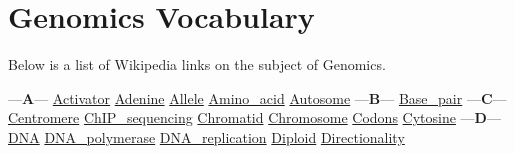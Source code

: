 \chapter{Genomics Vocabulary}
\label{ch-genomics-glossary}

\setlength{\columnsep}{3cm}

Below is a list of Wikipedia links on the subject of Genomics.


\begin{multicols}{3}
\noindent
---{\bf A}---\newline
\href{https://en.wikipedia.org/wiki/Activator_(genetics)}{Activator}\newline
\href{https://en.wikipedia.org/wiki/Adenine}{Adenine}\newline
\href{https://en.wikipedia.org/wiki/Allele}{Allele}\newline
\href{https://en.wikipedia.org/wiki/Amino_acid}{Amino\_acid}\newline
\href{https://en.wikipedia.org/wiki/Autosome}{Autosome}\newline
---{\bf B}---\newline
\href{https://en.wikipedia.org/wiki/Base_pair}{Base\_pair}\newline
---{\bf C}---\newline
\href{https://en.wikipedia.org/wiki/Centromere}{Centromere}\newline
\href{https://en.wikipedia.org/wiki/ChIP_sequencing}{ChIP\_sequencing}\newline
\href{https://en.wikipedia.org/wiki/Chromatid}{Chromatid}\newline
\href{https://en.wikipedia.org/wiki/Chromosome}{Chromosome}\newline
\href{https://en.wikipedia.org/wiki/Genetic_code#Codons}{Codons}\newline
\href{https://en.wikipedia.org/wiki/Cytosine}{Cytosine}\newline
---{\bf D}---\newline
\href{https://en.wikipedia.org/wiki/DNA}{DNA}\newline
\href{https://en.wikipedia.org/wiki/DNA_polymerase}{DNA\_polymerase}\newline
\href{https://en.wikipedia.org/wiki/DNA_replication}{DNA\_replication}\newline
\href{https://en.wikipedia.org/wiki/Ploidy#Diploid}{Diploid}\newline
\href{https://en.wikipedia.org/wiki/Directionality_(molecular_biology)}{Directionality}\newline

\end{multicols}
